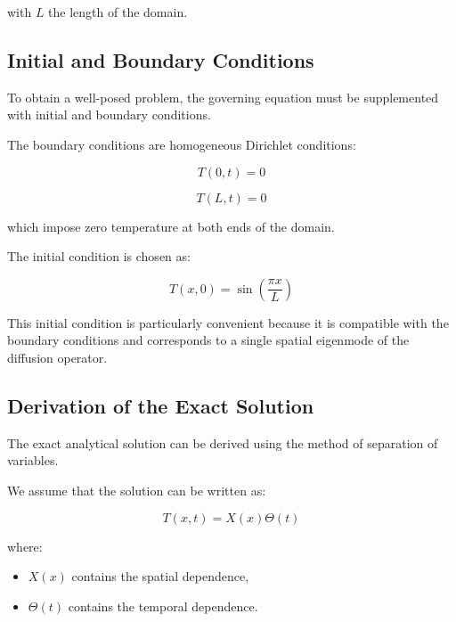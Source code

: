 with $L$ the length of the domain.

\subsection{Initial and Boundary Conditions}

To obtain a well-posed problem, the governing equation must be supplemented with initial and boundary conditions.

The boundary conditions are homogeneous Dirichlet conditions:

\begin{equation}
T(0,t)=0
\end{equation}

\begin{equation}
T(L,t)=0
\end{equation}

which impose zero temperature at both ends of the domain.

The initial condition is chosen as:

\begin{equation}
T(x,0)=\sin\left(\frac{\pi x}{L}\right)
\end{equation}

This initial condition is particularly convenient because it is compatible with the boundary conditions and corresponds to a single spatial eigenmode of the diffusion operator.

\subsection{Derivation of the Exact Solution}

The exact analytical solution can be derived using the method of separation of variables.

We assume that the solution can be written as:

\begin{equation}
T(x,t)=X(x)\Theta(t)
\end{equation}

where:
\begin{itemize}
    \item $X(x)$ contains the spatial dependence,
    \item $\Theta(t)$ contains the temporal dependence.
\end{itemize}

